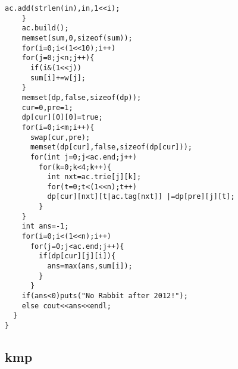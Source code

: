 \begin{lstlisting}[language={}]
      ac.add(strlen(in),in,1<<i);
    }
    ac.build();
    memset(sum,0,sizeof(sum));
    for(i=0;i<(1<<10);i++)
    for(j=0;j<n;j++){
      if(i&(1<<j))
      sum[i]+=w[j];
    }
    memset(dp,false,sizeof(dp));
    cur=0,pre=1;
    dp[cur][0][0]=true;
    for(i=0;i<m;i++){
      swap(cur,pre);
      memset(dp[cur],false,sizeof(dp[cur]));
      for(int j=0;j<ac.end;j++)
        for(k=0;k<4;k++){
          int nxt=ac.trie[j][k];
          for(t=0;t<(1<<n);t++)
          dp[cur][nxt][t|ac.tag[nxt]] |=dp[pre][j][t];
        }
    }
    int ans=-1;
    for(i=0;i<(1<<n);i++)
      for(j=0;j<ac.end;j++){
        if(dp[cur][j][i]){
          ans=max(ans,sum[i]);
        }
      }
    if(ans<0)puts("No Rabbit after 2012!");
    else cout<<ans<<endl;
  }
}
\end{lstlisting}
\subsection{kmp}
